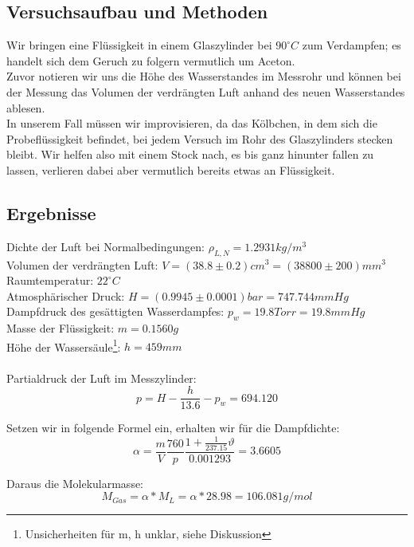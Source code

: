 \documentclass{article}
\begin{document}
\subsection{Versuchsaufbau und Methoden}
Wir bringen eine Flüssigkeit in einem Glaszylinder bei $90^\circ C$ zum Verdampfen; es handelt sich dem Geruch zu folgern vermutlich um Aceton. \\
Zuvor notieren wir uns die Höhe des Wasserstandes im Messrohr und können bei der Messung das Volumen der verdrängten Luft anhand des neuen Wasserstandes ablesen.\\
In unserem Fall müssen wir  improvisieren, da das Kölbchen, in dem sich die Probeflüssigkeit befindet, bei jedem Versuch im Rohr des Glaszylinders stecken bleibt. Wir helfen also mit einem Stock nach, es bis ganz hinunter fallen zu lassen, verlieren dabei aber vermutlich bereits etwas an Flüssigkeit. 
\subsection{Ergebnisse}

Dichte der Luft bei Normalbedingungen: $\rho_{L,N}=1.2931kg/m^3$\\
Volumen der verdrängten Luft: $V=(38.8 \pm 0.2)cm^3=(38800 \pm 200)mm^3$\\
Raumtemperatur: $22^\circ C$\\
Atmosphärischer Druck: $H=(0.9945 \pm 0.0001)bar=747.744mmHg$\\
Dampfdruck des gesättigten Wasserdampfes: $p_w=19.8Torr=19.8mmHg$\\
Masse der Flüssigkeit: $m=0.1560g$\\
Höhe der Wassersäule\footnote{Unsicherheiten für m, h unklar, siehe Diskussion}: $h=459mm$\\
\\
Partialdruck der Luft im Messzylinder:
\begin{equation}
p=H-\frac{h}{13.6}-p_w=694.120
\end{equation}

Setzen wir in folgende Formel ein, erhalten wir für die Dampfdichte:\\
\begin{equation}
\alpha=\frac{m}{V}\frac{760}{p}\frac{1+\frac{1}{237.15}\vartheta}{0.001293}=3.6605
\end{equation}

Daraus die Molekularmasse:\\
$$M_{Gas}=\alpha*M_L=\alpha*28.98=106.081g/mol$$
\end{document}
